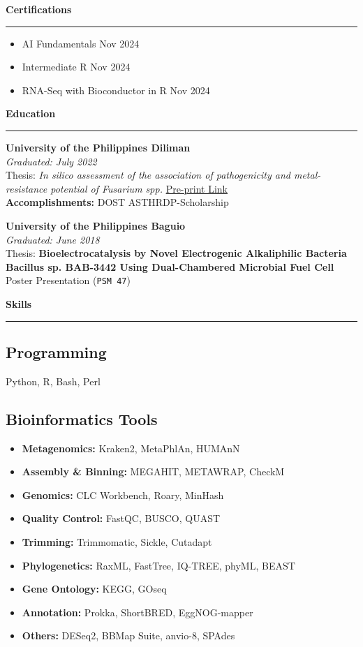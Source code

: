 \documentclass[a4paper,10pt]{article}
\newcommand{\sectiontitle}[1]{\vspace{10pt}\textbf{\Large #1}\vspace{5pt}\hrule\vspace{10pt}}
\begin{document}
	\sectiontitle{Certifications}
	\begin{itemize}[left=0pt]
		\item AI Fundamentals \dotfill Nov 2024
		\item Intermediate R \dotfill Nov 2024
		\item RNA-Seq with Bioconductor in R \dotfill Nov 2024
	\end{itemize}
	
	\sectiontitle{Education}
	
	\textbf{University of the Philippines Diliman} \\
	\textit{Graduated: July 2022} \\
	Thesis: \textit{In silico assessment of the association of pathogenicity and metal-resistance potential of \textit{Fusarium} spp.} \dotfill \href{https://www.biorxiv.org/content/10.1101/2022.10.12.511937v1}{Pre-print Link} \\
	\textbf{Accomplishments:} DOST ASTHRDP-Scholarship
	
	\textbf{University of the Philippines Baguio} \\
	\textit{Graduated: June 2018} \\
	Thesis: \textbf{Bioelectrocatalysis by Novel Electrogenic Alkaliphilic Bacteria Bacillus sp. BAB-3442 Using Dual-Chambered Microbial Fuel Cell} \dotfill Poster Presentation (\texttt{PSM 47})
	
	\sectiontitle{Skills}
	
	\subsection*{Programming}
	Python, R, Bash, Perl
	
	\subsection*{Bioinformatics Tools}
	\begin{itemize}[left=0pt]
		\item \textbf{Metagenomics:} Kraken2, MetaPhlAn, HUMAnN
		\item \textbf{Assembly \& Binning:} MEGAHIT, METAWRAP, CheckM
		\item \textbf{Genomics:} CLC Workbench, Roary, MinHash
		\item \textbf{Quality Control:} FastQC, BUSCO, QUAST
		\item \textbf{Trimming:} Trimmomatic, Sickle, Cutadapt
		\item \textbf{Phylogenetics:} RaxML, FastTree, IQ-TREE, phyML, BEAST
		\item \textbf{Gene Ontology:} KEGG, GOseq
		\item \textbf{Annotation:} Prokka, ShortBRED, EggNOG-mapper
		\item \textbf{Others:} DESeq2, BBMap Suite, anvio-8, SPAdes
	\end{itemize}
	
\end{document}
